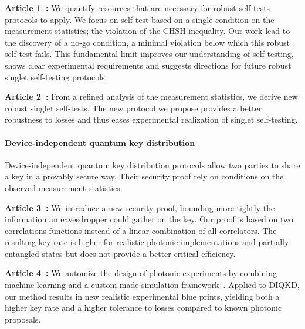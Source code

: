 \medbreak

\textbf{Article 1~\cite{Valcarce2020}:} We quantify resources that are necessary for robust self-tests protocols to apply.
We focus on self-test based on a single condition on the measurement statistics; the violation of the CHSH inequality.
Our work lead to the discovery of a no-go condition, a minimal violation below which this robust self-test fails.
This fundamental limit improves our understanding of self-testing, shows clear experimental requirements and suggests directions for future robust singlet self-testing protocols.

\textbf{Article 2~\cite{Valcarce2022}:} From a refined analysis of the measurement statistics, we derive new robust singlet self-tests.
The new protocol we propose provides a better robustness to losses and thus eases experimental realization of singlet self-testing.

\paragraph{Device-independent quantum key distribution}

Device-independent quantum key distribution protocols allow two parties to share a key in a provably secure way.
Their security proof rely on conditions on the observed measurement statistics. 

\medbreak

\textbf{Article 3~\cite{Sekatski2021}:} We introduce a new security proof, bounding more tightly the information an eavesdropper could gather on the key.
Our proof is based on two correlations functions instead of a linear combination of all correlators.
The resulting key rate is higher for realistic photonic implementations and partially entangled states but does not provide a better critical efficiency.

\textbf{Article 4~\cite{Valcarce2022b}:} We automize the design of photonic experiments by combining machine learning and a custom-made simulation framework~\cite{Valcarce2021}. Applied to DIQKD, our method results in new realistic experimental blue prints, yielding both a higher key rate and a higher tolerance to losses compared to known photonic proposals.

